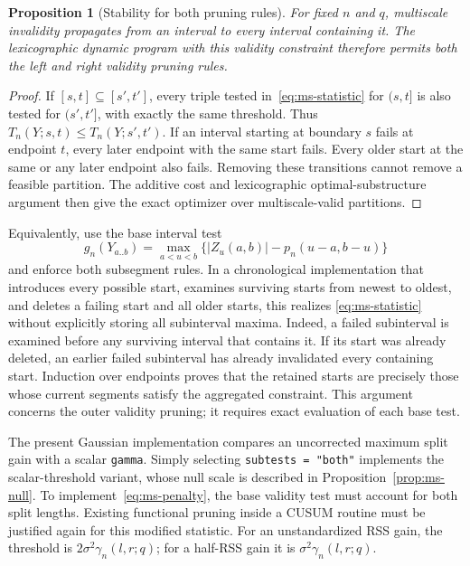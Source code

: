 \documentclass[pdflatex,sn-mathphys-num]{sn-jnl}
\theoremstyle{thmstyleone}
\newtheorem{proposition}[theorem]{Proposition}
\theoremstyle{thmstyletwo}
\begin{document}
\begin{proposition}[Stability for both pruning rules]\label{prop:ms-pruning}
For fixed $n$ and $q$, multiscale invalidity propagates from an interval to
every interval containing it. The lexicographic dynamic program with this
validity constraint therefore permits both the left and right validity
pruning rules.
\end{proposition}
\begin{proof}
If $[s,t]\subseteq[s',t']$, every triple tested in~\eqref{eq:ms-statistic}
for $(s,t]$ is also tested for $(s',t']$, with exactly the same threshold.
Thus $T_n(Y;s,t)\le T_n(Y;s',t')$. If an interval starting at boundary $s$
fails at endpoint $t$, every later endpoint with the same start fails.
Every older start at the same or any later endpoint also fails. Removing
these transitions cannot remove a feasible partition. The additive cost
and lexicographic optimal-substructure argument then give the exact
optimizer over multiscale-valid partitions.
\end{proof}

Equivalently, use the base interval test
\[
g_n(Y_{a..b})=\max_{a<u<b}
\{|Z_u(a,b)|-p_n(u-a,b-u)\}
\]
and enforce both subsegment rules. In a chronological implementation that
introduces every possible start, examines surviving starts from newest to
oldest, and deletes a failing start and all older starts, this realizes
\eqref{eq:ms-statistic} without explicitly storing all subinterval maxima.
Indeed, a failed subinterval is examined before any surviving interval
that contains it. If its start was already deleted, an earlier failed
subinterval has already invalidated every containing start. Induction over
endpoints proves that the retained starts are precisely those whose current
segments satisfy the aggregated constraint. This argument concerns the
outer validity pruning; it requires exact evaluation of each base test.

The present Gaussian implementation compares an uncorrected maximum split
gain with a scalar \texttt{gamma}. Simply selecting
\texttt{subtests = "both"} implements the scalar-threshold variant, whose
null scale is described in Proposition~\ref{prop:ms-null}.
To implement~\eqref{eq:ms-penalty}, the base validity test must account for
both split lengths. Existing functional pruning inside a CUSUM routine
must be justified again for this modified statistic. For an unstandardized
RSS gain, the threshold is $2\sigma^2\gamma_n(l,r;q)$; for a half-RSS gain
it is $\sigma^2\gamma_n(l,r;q)$.
\end{document}
